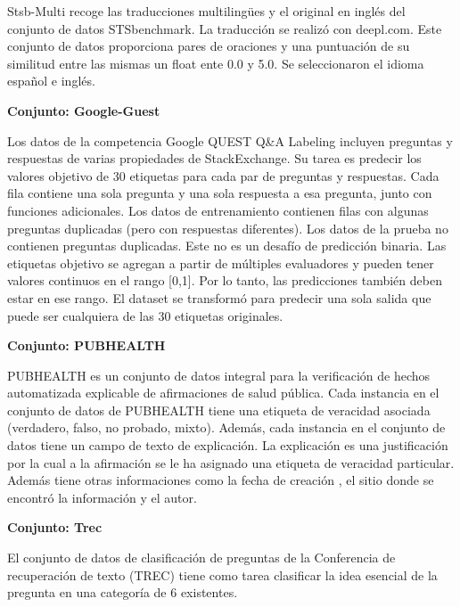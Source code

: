 \begin{annexes}
Stsb-Multi recoge las traducciones multilingües y el original en inglés del conjunto de datos STSbenchmark. La traducción se realizó con deepl.com.
Este conjunto de datos proporciona pares de oraciones y una puntuación de su similitud entre las mismas un float ente 0.0 y 5.0. Se seleccionaron el idioma español e inglés. 

\begin{flushleft} 
    { \textbf{Conjunto: Google-Guest}}\label{description:google}
\end{flushleft}

Los datos de la competencia Google QUEST Q\&A Labeling incluyen preguntas y respuestas de varias propiedades de StackExchange. Su tarea es predecir los valores objetivo de 30 etiquetas para cada par de preguntas y respuestas. Cada fila contiene una sola pregunta y una sola respuesta a esa pregunta, junto con funciones adicionales. Los datos de entrenamiento contienen filas con algunas preguntas duplicadas (pero con respuestas diferentes). Los datos de la prueba no contienen preguntas duplicadas. Este no es un desafío de predicción binaria. Las etiquetas objetivo se agregan a partir de múltiples evaluadores y pueden tener valores continuos en el rango [0,1]. Por lo tanto, las predicciones también deben estar en ese rango. El dataset se transformó para predecir una sola salida que puede ser cualquiera de las 30 etiquetas originales. 


\begin{flushleft} 
    { \textbf{Conjunto: PUBHEALTH}}\label{description:pubhealth}
\end{flushleft}

PUBHEALTH es un conjunto de datos integral para la verificación de hechos automatizada explicable de afirmaciones de salud pública. Cada instancia en el conjunto de datos de PUBHEALTH tiene una etiqueta de veracidad asociada (verdadero, falso, no probado, mixto). Además, cada instancia en el conjunto de datos tiene un campo de texto de explicación. La explicación es una justificación por la cual a la afirmación se le ha asignado una etiqueta de veracidad particular. Además tiene otras informaciones como la fecha de creación , el sitio donde se encontró la información  y el autor.

\begin{flushleft} 
    { \textbf{Conjunto: Trec}}\label{description:trec}
\end{flushleft}

El conjunto de datos de clasificación de preguntas de la Conferencia de recuperación de texto (TREC) tiene como tarea clasificar la idea esencial de la pregunta en una categoría de 6 existentes.

\end{annexes}



